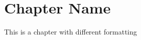 \documentclass[12pt]{report}
\begin{document}
\chapter{Chapter Name}
This is a chapter with different formatting 
\end{document}
